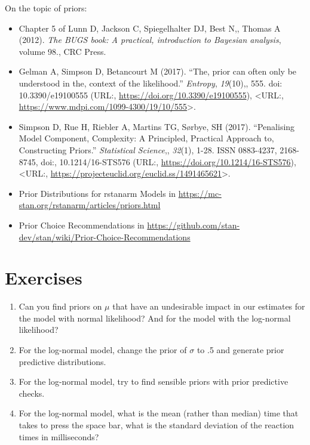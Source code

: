 \documentclass[12pt,]{krantz}
\providecommand{\tightlist}{%
  \setlength{\itemsep}{0pt}\setlength{\parskip}{0pt}}
\theoremstyle{definition}
\theoremstyle{definition}
\theoremstyle{definition}
\theoremstyle{remark}
\begin{document}
On the topic of priors:

\begin{itemize}
\tightlist
\item
  Chapter 5 of Lunn D, Jackson C, Spiegelhalter DJ, Best N,, Thomas A (2012). \emph{The BUGS book: A practical, introduction to Bayesian analysis}, volume 98., CRC Press.
\item
  Gelman A, Simpson D, Betancourt M (2017). ``The, prior can often only be understood in the, context of the likelihood.'' \emph{Entropy}, \emph{19}(10),, 555. doi: 10.3390/e19100555 (URL:, \url{https://doi.org/10.3390/e19100555}), \textless{}URL:, \url{https://www.mdpi.com/1099-4300/19/10/555}\textgreater{}.
\item
  Simpson D, Rue H, Riebler A, Martins TG, Sørbye, SH (2017). ``Penalising Model Component, Complexity: A Principled, Practical Approach to, Constructing Priors.'' \emph{Statistical Science},, \emph{32}(1), 1-28. ISSN 0883-4237, 2168-8745, doi:, 10.1214/16-STS576 (URL:, \url{https://doi.org/10.1214/16-STS576}), \textless{}URL:, \url{https://projecteuclid.org/euclid.ss/1491465621}\textgreater{}.
\item
  Prior Distributions for rstanarm Models in \url{https://mc-stan.org/rstanarm/articles/priors.html}
\item
  Prior Choice Recommendations in \url{https://github.com/stan-dev/stan/wiki/Prior-Choice-Recommendations}
\end{itemize}

\hypertarget{exercises-2}{%
\section{Exercises}\label{exercises-2}}

\begin{enumerate}
\def\labelenumi{\arabic{enumi}.}
\tightlist
\item
  Can you find priors on \(\mu\) that have an undesirable impact in our estimates for the model with normal likelihood? And for the model with the log-normal likelihood?
\item
  For the log-normal model, change the prior of \(\sigma\) to .5 and generate prior predictive distributions.
\item
  For the log-normal model, try to find sensible priors with prior predictive checks.
\item
  For the log-normal model, what is the mean (rather than median) time that takes to press the space bar, what is the standard deviation of the reaction times in milliseconds?
\end{enumerate}
\end{document}
